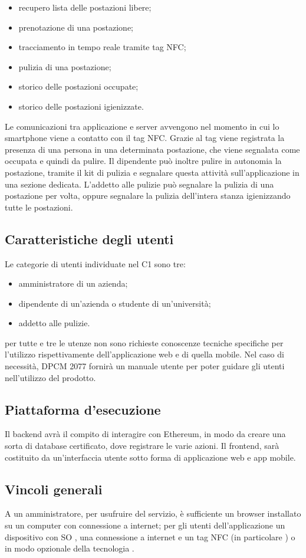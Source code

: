 \begin{itemize}
	\item recupero lista delle postazioni libere; \\
	\item prenotazione di una postazione; \\
	\item tracciamento in tempo reale tramite tag NFC; \\
	\item pulizia di una postazione; \\
	\item storico delle postazioni occupate; \\
	\item storico delle postazioni igienizzate. \\ 
\end{itemize}
Le comunicazioni tra applicazione e server avvengono nel momento in cui lo smartphone viene a contatto con il tag NFC. Grazie al tag viene registrata la presenza di una persona in una determinata postazione, che viene segnalata come occupata e quindi da pulire. Il dipendente può inoltre pulire in autonomia la postazione, tramite il kit di pulizia e segnalare questa attività sull’applicazione in una sezione dedicata.
L’addetto alle pulizie può segnalare la pulizia di una postazione per volta, oppure segnalare la pulizia dell’intera stanza igienizzando tutte le postazioni.

\subsection{Caratteristiche degli utenti}
Le categorie di utenti individuate nel C1 sono tre:
\begin{itemize}
	\item amministratore di un azienda;
	\item dipendente di un'azienda o studente di un'università;
    \item addetto alle pulizie.
\end{itemize}
per tutte e tre le utenze non sono richieste conoscenze tecniche specifiche per l'utilizzo rispettivamente dell'applicazione web e di quella mobile. Nel caso di necessità, DPCM 2077 fornirà un manuale utente per poter guidare gli utenti nell'utilizzo del prodotto.
\subsection{Piattaforma d'esecuzione}
Il backend avrà il compito di interagire con Ethereum, in modo da creare una sorta di database certificato, dove registrare le varie azioni. Il frontend, sarà costituito da un'interfaccia utente sotto forma di applicazione web e app mobile. 
\subsection{Vincoli generali}
A un amministratore, per usufruire del servizio, è sufficiente un browser installato su un computer con connessione a internet; per gli utenti dell'applicazione un dispositivo con SO , una connessione a internet e un tag NFC (in particolare ) o in modo opzionale della tecnologia .

